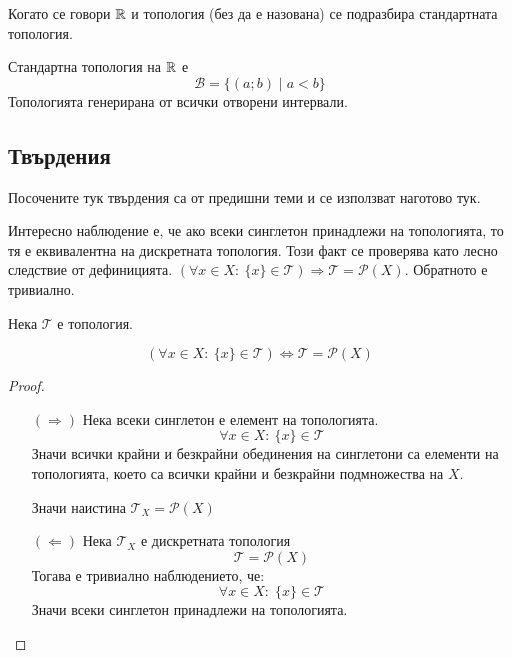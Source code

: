 Когато се говори ${\mathbb{R}}$ и топология (без да е назована) се подразбира стандартната топология.
\begin{definition}
    Стандартна топология на ${\mathbb{R}}$ е
    \begin{equation*}
        \mathcal B = \{(a;b) \mid a<b\}
    \end{equation*}
    Топологията генерирана от всички отворени интервали.
\end{definition}

\subsection{Твърдения}
Посочените тук твърдения са от предишни теми и се използват наготово тук.

Интересно наблюдение е, че ако всеки синглетон принадлежи на топологията, то тя е еквивалентна на дискретната топология. Този факт се проверява като лесно следствие от дефиницията. $(\forall x \in X:\ \{x\} \in \mathcal T) \Rightarrow \mathcal T = \mathcal P(X)$. Обратното е тривиално.
\begin{lemma}
    Нека $\mathcal T$ е топология.

    \begin{equation*}
        (\forall x \in X:\ \{x\} \in \mathcal T) \iff \mathcal T = \mathcal P (X)
    \end{equation*}
\end{lemma}
\begin{proof}
    \begin{itemize}
        \item[$(\Rightarrow)$] Нека всеки синглетон е елемент на топологията.
        \begin{equation}
            \forall x \in X:\ \{x\} \in \mathcal T
        \end{equation}
        Значи всички крайни и безкрайни обединения на синглетони са елементи на топологията, което са всички крайни и безкрайни подмножества на $X$.
        
        Значи наистина $\mathcal T_X = \mathcal P (X)$

        \item[$(\Leftarrow)$] Нека $\mathcal T_X$ е дискретната топология
        \begin{equation}
            \mathcal T = \mathcal P (X)
        \end{equation}
        Тогава е тривиално наблюдението, че:
        \begin{equation}
            \forall x \in X:\; \{x\} \in \mathcal T
        \end{equation}
        Значи всеки синглетон принадлежи на топологията.
    \end{itemize}
\end{proof}

